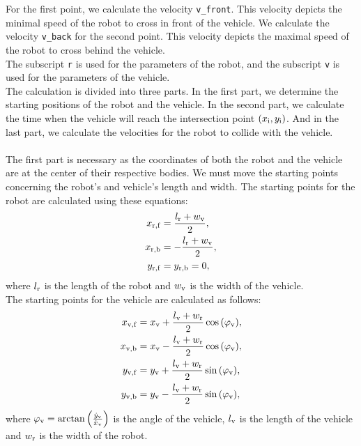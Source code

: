         \noindent For the first point, we calculate the velocity \texttt{v\_front}. This velocity depicts the minimal speed of the robot to cross in front of the vehicle. We calculate the velocity \texttt{v\_back} for the second point. This velocity depicts the maximal speed of the robot to cross behind the vehicle.\\
        The subscript \texttt{r} is used for the parameters of the robot, and the subscript \texttt{v} is used for the parameters of the vehicle.\\
        The calculation is divided into three parts. In the first part, we determine the starting positions of the robot and the vehicle. In the second part, we calculate the time when the vehicle will reach the intersection point $(x_{\rm{i}}, y_{\rm{i}})$. And in the last part, we calculate the velocities for the robot to collide with the vehicle.\\\\
        The first part is necessary as the coordinates of both the robot and the vehicle are at the center of their respective bodies. We must move the starting points concerning the robot's and vehicle's length and width. The starting points for the robot are calculated using these equations:
        \begin{align}
            x_{\rm{r,f}} &= \frac{l_{\rm{r}}+w_{\rm{v}}}{2},\\
            x_{\rm{r,b}} &= -\frac{l_{\rm{r}}+w_{\rm{v}}}{2},\\
            y_{\rm{r,f}} &= y_{\rm{r,b}} = 0,
        \end{align}
        where $l_{\rm{r}}$ is the length of the robot and $w_{\rm{v}}$ is the width of the vehicle.\\
        The starting points for the vehicle are calculated as follows:
        \begin{align}
            x_{\rm{v,f}} &= x_{\rm{v}} + \frac{l_{\rm{v}}+w_{\rm{r}}}{2}\cos{(\varphi_{\rm{v}})},\\
            x_{\rm{v,b}} &= x_{\rm{v}} - \frac{l_{\rm{v}}+w_{\rm{r}}}{2}\cos{(\varphi_{\rm{v}})},\\
            y_{\rm{v,f}} &= y_{\rm{v}} + \frac{l_{\rm{v}}+w_{\rm{r}}}{2}\sin{(\varphi_{\rm{v}})},\\
            y_{\rm{v,b}} &= y_{\rm{v}} - \frac{l_{\rm{v}}+w_{\rm{r}}}{2}\sin{(\varphi_{\rm{v}})},
        \end{align}
        where $\varphi_{\rm{v}} = \arctan{\left(\frac{\dot{y}_{\rm{v}}}{\dot{x}_{\rm{v}}}\right)}$ is the angle of the vehicle, $l_{\rm{v}}$ is the length of the vehicle and $w_{\rm{r}}$ is the width of the robot.\\
